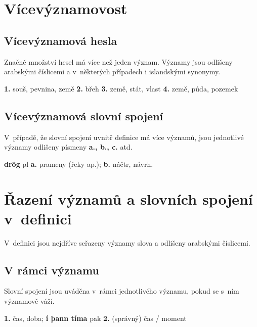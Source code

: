 \section{Vícevýznamovost}

\subsection*{Vícevýznamová hesla}

Značné množství hesel má více než jeden význam. Významy jsou odlišeny arabskými číslicemi a v~některých případech i islandskými synonymy.

\blspace
  \dicEntry {}   {\textbf{1.}}  {souš, pevnina, země} {\textbf{2.}}  {břeh} {\textbf{3.}}  {země, stát, vlast} {\textbf{4.}}  {země, půda, pozemek}
\blspace

\subsection*{Vícevýznamová slovní spojení}

V~případě, že slovní spojení uvnitř definice má více významů, jsou jednotlivé významy odlišeny písmeny {\textbf{a., b., c.}} atd.

\blspace
  \dicEntry {} {  \textbf{drög} {\footnotesize{pl}} {\textbf{a.}}  {prameny (řeky ap.);} {\textbf{b.}} {náčtr, návrh.}}
\blspace

\section{Řazení významů a slovních spojení v~definici}

V~definici jsou nejdříve seřazeny významy slova a odlišeny arabskými číslicemi.

\subsection*{V rámci významu}

Slovní spojení jsou uváděna v~rámci jednotlivého významu, pokud se s~ním významově váží.

\blspace
  \dicEntry {}   {\textbf{1.}}  {čas, doba}; \textbf{í þann tíma}   {pak} {\textbf{2.}}  {(správný) čas / moment}
\blspace

